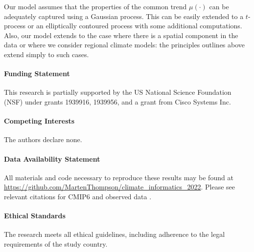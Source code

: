 \documentclass{CUP-JNL-EDS}
\begin{document}
Our model assumes that the properties of the common trend $\mu (\cdot)$ can be adequately captured using a Gaussian process. This can be easily extended to a $t$-process or an elliptically contoured process with some additional computations. Also, our model  extends to the case where there is a spatial component in the data or where we consider regional climate models: the principles outlines above extend simply to such cases.

% 
%


\begin{Backmatter}


\paragraph{Funding Statement}
This research is partially  supported by
the US National Science Foundation (NSF) under grants 
 1939916, 1939956, and a grant from Cisco Systems Inc.


\paragraph{Competing Interests}
The authors declare none.

\paragraph{Data Availability Statement}
All materials and code necessary to reproduce these results may be found at \url{https://github.com/MartenThompson/climate_informatics_2022}. Please see relevant citations for CMIP6 \cite{access-cm2,access-esm1-5,awi-cm-1-1-mr,bcc-csm2-mr,cams-csm1-0,canesm5,canesm5-canoe,fgoals-g3,giss-e2-1-g,miroc-es2l,miroc6,mpi-esm1-2-hr-DKRZ,mpi-esm1-2-lr,mri-esm2-0,noresm2-lm,noresm2-mm,ukesm1-0-ll-MOHC}  and observed data \cite{jones1999surface, morice2021updated}. 


\paragraph{Ethical Standards}
The research meets all ethical guidelines, including adherence to the legal requirements of the study country.


\end{Backmatter}
\end{document}
